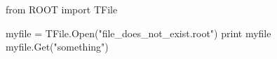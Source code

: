 \begin{footnotesize}
\begin{pyglist}[language=python,texcl=true,abovecaptionskip=0,style=vs,bgcolor=Moccasin]
from ROOT import TFile

myfile = TFile.Open("file_does_not_exist.root")
print myfile
myfile.Get("something")
\end{pyglist}
\end{footnotesize}
